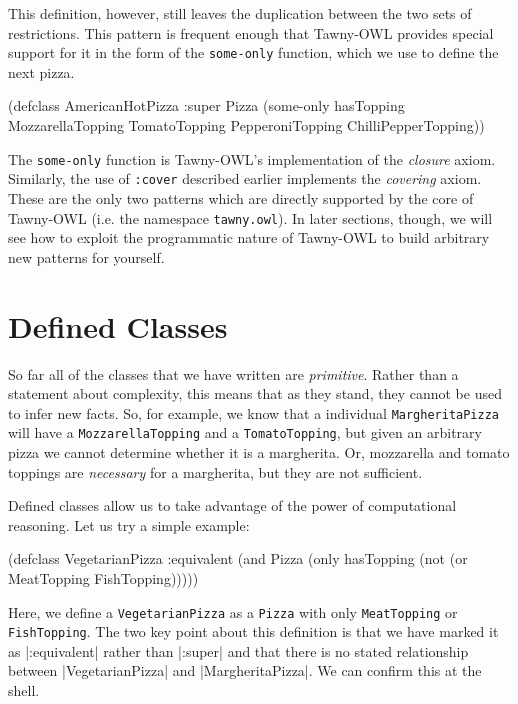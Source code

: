 This definition, however, still leaves the duplication between the two sets of
restrictions. This pattern is frequent enough that Tawny-OWL provides special
support for it in the form of the \verb~some-only~ function, which we use to define
the next pizza.

\begin{tawny}
(defclass AmericanHotPizza
  :super
  Pizza
  (some-only hasTopping MozzarellaTopping TomatoTopping
             PepperoniTopping ChilliPepperTopping))
\end{tawny}

The \verb~some-only~ function is Tawny-OWL's implementation of the \emph{closure} axiom.
Similarly, the use of \verb~:cover~ described earlier implements the \emph{covering}
axiom. These are the only two patterns which are directly supported by the
core of Tawny-OWL (i.e. the namespace \verb~tawny.owl~). In later sections, though,
we will see how to exploit the programmatic nature of Tawny-OWL to build
arbitrary new patterns for yourself.


\section{Defined Classes}
\label{sec-5-7}
\label{defined}

So far all of the classes that we have written are \emph{primitive}. Rather than a
statement about complexity, this means that as they stand, they cannot be used
to infer new facts. So, for example, we know that a individual
\verb~MargheritaPizza~ will have a \verb~MozzarellaTopping~ and a \verb~TomatoTopping~, but
given an arbitrary pizza we cannot determine whether it is a margherita. Or,
mozzarella and tomato toppings are \emph{necessary} for a margherita, but they are
not sufficient.

Defined classes allow us to take advantage of the power of computational
reasoning. Let us try a simple example:

\begin{tawny}
(defclass VegetarianPizza
  :equivalent
  (and Pizza
       (only hasTopping
             (not (or MeatTopping FishTopping)))))
\end{tawny}

Here, we define a \verb~VegetarianPizza~ as a \verb~Pizza~ with only
\verb~MeatTopping~ or \verb~FishTopping~. The two key point about this
definition is that we have marked it as |:equivalent| rather than |:super| and
that there is no stated relationship between |VegetarianPizza| and
|MargheritaPizza|. We can confirm this at the shell. 


